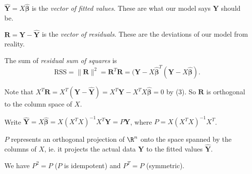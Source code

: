 \documentclass[a4paper]{article}
\begin{document}
\begin{defi}
  $\hat{\mathbf{Y}} = X\hat{\boldsymbol\beta}$ is the \emph{vector of fitted values}. These are what our model says $\mathbf{Y}$ should be.

  $\mathbf{R} = \mathbf{Y} - \hat{\mathbf{Y}}$ is the \emph{vector of residuals}. These are the deviations of our model from reality.

  The sum of \emph{residual sum of squares} is
  \[
    \mathrm{RSS} = \|\mathbf{R}\|^2 = \mathbf{R}^T\mathbf{R} = (\mathbf{Y} - X\hat{\boldsymbol\beta}^T(\mathbf{Y} - X\hat{\boldsymbol\beta}).
  \]
\end{defi}
Note that $X^T\mathbf{R} = X^T(\mathbf{Y} - \hat{\mathbf{Y}}) = X^T\mathbf{Y} - X^TX\hat{\boldsymbol\beta} = 0$ by (3). So $\mathbf{R}$ is orthogonal to the column space of $X$.

Write $\hat{\mathbf{Y}} = X\hat{\boldsymbol\beta} = X(X^TX)^{-1}X^T\mathbf{Y} = P\mathbf{Y}$, where $P = X(X^TX)^{-1}X^T$.

$P$ represents an orthogonal projection of $\R^n$ onto the space spanned by the columns of $X$, ie. it projects the actual data $\mathbf{Y}$ to the fitted values $\hat{\mathbf{Y}}$.

We have $P^2 = P$ ($P$ is idempotent) and $P^T = P$ (symmetric).
\end{document}

